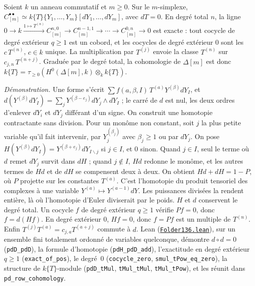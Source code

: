 \begin{encadre}
\begin{theoreme*}
Soient $k$ un anneau commutatif et $m \geq 0$. Sur le $m$-simplexe, $C^{\bullet\bullet}_{[m]} \simeq k\{T\}\{Y_1, \ldots, Y_m\}[dY_1, \ldots, dY_m]$, avec $dT = 0$. En degré total $n$, la ligne $0 \to k \xrightarrow{1 \mapsto T^{(n)}} C^{n,0}_{[m]} \to C^{n-1,1}_{[m]} \to \cdots \to C^{0,n}_{[m]} \to 0$ est exacte : tout cocycle de degré extérieur $q \geq 1$ est un cobord, et les cocycles de degré extérieur $0$ sont les $c\,T^{(n)}$, $c \in k$ unique. La multiplication par $T^{(j)}$ envoie la classe $T^{(n)}$ sur $c_{j,n}\,T^{(n+j)}$. Graduée par le degré total, la cohomologie de $\Delta[m]$ est donc $k\{T\} = \tau_{\geq 0}(H^0(\Delta[m], k) \otimes_k k\{T\})$.
\end{theoreme*}
\end{encadre}
{\small \emph{Démonstration.} Une forme s'écrit $\sum f(a, \beta, I)\, T^{(a)} Y^{(\beta)} dY_I$, et $d(Y^{(\beta)} dY_I) = \sum_j Y^{(\beta - e_j)} dY_j \wedge dY_I$ ; le carré de $d$ est nul, les deux ordres d'enlever $dY_i$ et $dY_j$ différant d'un signe. On construit une homotopie contractante sans division. Pour un monôme non constant, soit $j$ la plus petite variable qu'il fait intervenir, par $Y_j^{(\beta_j)}$ avec $\beta_j \geq 1$ ou par $dY_j$. On pose $H(Y^{(\beta)} dY_I) = Y^{(\beta + e_j)} dY_{I \smallsetminus j}$ si $j \in I$, et $0$ sinon. Quand $j \in I$, seul le terme où $d$ remet $dY_j$ survit dans $dH$ ; quand $j \notin I$, $Hd$ redonne le monôme, et les autres termes de $Hd$ et de $dH$ se compensent deux à deux. On obtient $Hd + dH = 1 - P$, où $P$ projette sur les constantes $T^{(a)}$. C'est l'homotopie du produit tensoriel des complexes à une variable $Y^{(a)} \mapsto Y^{(a-1)} dY$. Les puissances divisées la rendent entière, là où l'homotopie d'Euler diviserait par le poids. $H$ et $d$ conservent le degré total. Un cocycle $f$ de degré extérieur $q \geq 1$ vérifie $Pf = 0$, donc $f = d(Hf)$. En degré extérieur $0$, $Hf = 0$, donc $f = Pf$ est un multiple de $T^{(n)}$. Enfin $T^{(j)} T^{(a)} = c_{j,a} T^{(a+j)}$ commute à $d$. Lean (\href{\leanblob/RingTheory/Folder136.lean}{\texttt{Folder136.\allowbreak{}lean}}), sur un ensemble fini totalement ordonné de variables quelconque, démontre $d \circ d = 0$ (\texttt{pdD\_pdD}), la formule d'homotopie (\texttt{pdH\_pdD\_add}), l'exactitude en degré extérieur $q \geq 1$ (\texttt{exact\_of\_pos}), le degré~$0$ (\texttt{cocycle\_zero}, \texttt{smul\_tPow\_eq\_zero}), la structure de $k\{T\}$-module (\texttt{pdD\_tMul}, \texttt{tMul\_tMul}, \texttt{tMul\_tPow}), et les réunit dans \texttt{pd\_row\_cohomology}.\par}
